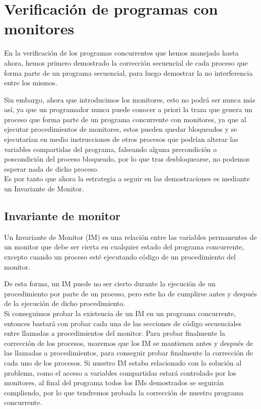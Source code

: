\section{Verificación de programas con monitores}
En la verificación de los programas concurrentes que hemos manejado hasta ahora, hemos primero demostrado la corrección secuencial de cada proceso que forma parte de un programa secuencial, para luego demostrar la no interferencia entre los mismos. 

Sin embargo, ahora que introducimos los monitores, esto no podrá ser nunca más así, ya que un programador nunca puede conocer a priori la traza que genera un proceso que forma parte de un programa concurrente con monitores, ya que al ejecutar procedimientos de monitores, estos pueden quedar bloqueados y se ejecutarían en medio instrucciones de otros procesos que podrían alterar las variables compartidas del programa, falseando alguna precondición o poscondición del proceso bloqueado, por lo que tras desbloquearse, no podemos esperar nada de dicho proceso.\\

Es por tanto que ahora la estrategia a seguir en las demostraciones es mediante un Invariante de Monitor.

\subsection{Invariante de monitor}
\begin{definicion}
    Un Invariante de Monitor (IM) es una relación entre las variables permanentes de un monitor que debe ser cierta en cualquier estado del programa concurrente, excepto cuando un proceso esté ejecutando código de un procedimiento del monitor.
\end{definicion}
De esta forma, un IM puede no ser cierto durante la ejecución de un procedimiento por parte de un proceso, pero este ha de cumplirse antes y después de la ejecución de dicho procedimiento.\\

Si conseguimos probar la existencia de un IM en un programa concurrente, entonces bastará con probar cada una de las secciones de código secuenciales entre llamadas a procedimientos del monitor. Para probar finalmente la corrección de los procesos, usaremos que los IM se mantienen antes y después de las llamadas a procedimientos, para conseguir probar finalmente la corrección de cada uno de los procesos. Si nuestro IM estaba relacionado con la solución al problema, como el acceso a variables compartidas estará controlado por los monitores, al final del programa todos los IMs demostrados se seguirán compliendo, por lo que tendremos probada la corrección de nuestro programa concurrente.


